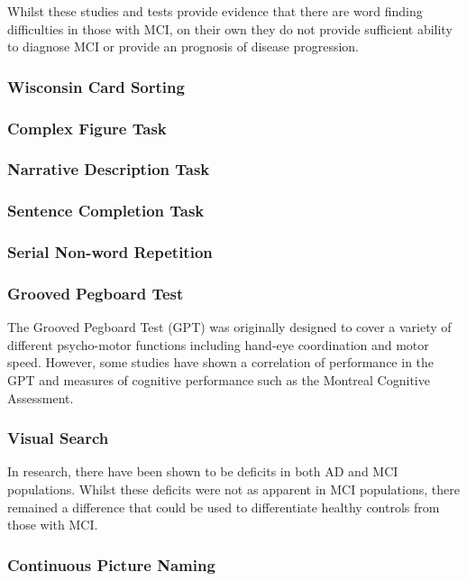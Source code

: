 \documentclass{article}
\begin{document}
Whilst these studies and tests provide evidence that there are word finding difficulties in those with MCI, on their own they do not provide sufficient ability to diagnose MCI or provide an prognosis of disease progression.
\subsubsection{Wisconsin Card Sorting}


\subsubsection{Complex Figure Task}


\subsubsection{Narrative Description Task}


\subsubsection{Sentence Completion Task}


\subsubsection{Serial Non-word Repetition}


\subsubsection{Grooved Pegboard Test}
The Grooved Pegboard Test (GPT) was originally designed to cover a variety of different psycho-motor functions including hand-eye coordination and motor speed. However, some studies have shown a correlation of performance in the GPT and measures of cognitive performance such as the Montreal Cognitive Assessment.  
\subsubsection{Visual Search}
In research, there have been shown to be deficits in both AD and MCI populations. Whilst these deficits were not as apparent in MCI populations, there remained a difference that could be used to differentiate healthy controls from those with MCI.

\subsubsection{Continuous Picture Naming}
\end{document}
